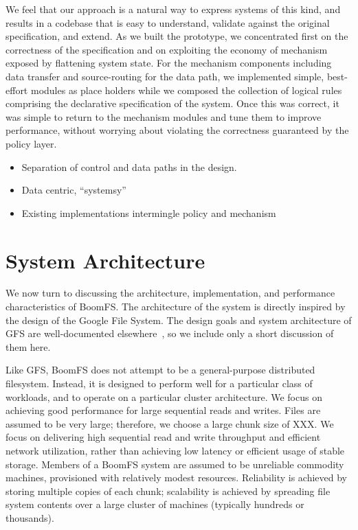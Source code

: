 \documentclass{article}
\begin{document}
We feel that our approach is a natural way to express systems of this kind, and results in a codebase that is easy to understand, validate against the original specification, and extend.  As we built the prototype, we concentrated first on the correctness of the specification and on exploiting the economy of mechanism exposed by flattening system state.  For the mechanism components including data transfer and source-routing for the data path, we implemented simple, best-effort modules as place holders while we composed the collection of logical rules comprising the declarative specification of the system.  Once this was correct, it was simple to return to the mechanism modules and tune them to improve performance, without worrying about violating the correctness guaranteed by the policy layer.




\begin{itemize}
\item
  Separation of control and data paths in the design.

\item
  Data centric, ``systemsy''

\item
  Existing implementations intermingle policy and mechanism
\end{itemize}

\section{System Architecture}
\label{system-arch}
We now turn to discussing the architecture, implementation, and
performance characteristics of BoomFS. The architecture of the system
is directly inspired by the design of the Google File System. The
design goals and system architecture of GFS are well-documented
elsewhere~\cite{gfs, hdfs-arch}, so we include only a short discussion
of them here.

Like GFS, BoomFS does not attempt to be a general-purpose distributed
filesystem. Instead, it is designed to perform well for a particular
class of workloads, and to operate on a particular cluster
architecture. We focus on achieving good performance for large
sequential reads and writes. Files are assumed to be very large;
therefore, we choose a large chunk size of XXX. We focus on delivering
high sequential read and write throughput and efficient network
utilization, rather than achieving low latency or efficient usage of
stable storage. Members of a BoomFS system are assumed to be
unreliable commodity machines, provisioned with relatively modest
resources.  Reliability is achieved by storing multiple copies of each
chunk; scalability is achieved by spreading file system contents over
a large cluster of machines (typically hundreds or thousands).
\end{document}

